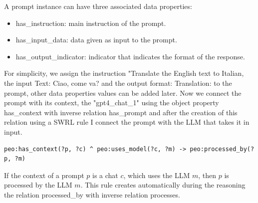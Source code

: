 A prompt instance can have three associated data properties:
\begin{itemize}
    \item has\_instruction: main instruction of the prompt.

    \item has\_input\_data: data given as input to the prompt. 

    \item has\_output\_indicator: indicator that indicates the format of the response.
\end{itemize}
For simplicity, we assign the instruction "Translate the English text to Italian, the input Text: Ciao, come va?  and the output format: Translation:  to the prompt, other data properties values can be added later.
Now we connect the prompt with its context, the "gpt4\_chat\_1" using the object property has\_context with inverse relation has\_prompt and after the creation of this relation using a SWRL rule I connect the prompt with the LLM that takes it in input. 
\begin{lstlisting}
peo:has_context(?p, ?c) ^ peo:uses_model(?c, ?m) -> peo:processed_by(?p, ?m)   
\end{lstlisting}
If the context of a prompt $p$ is a chat $c$, which uses the LLM $m$, then $p$ is processed by the LLM $m$.
This rule creates automatically during the reasoning the relation processed\_by with inverse relation processes.

